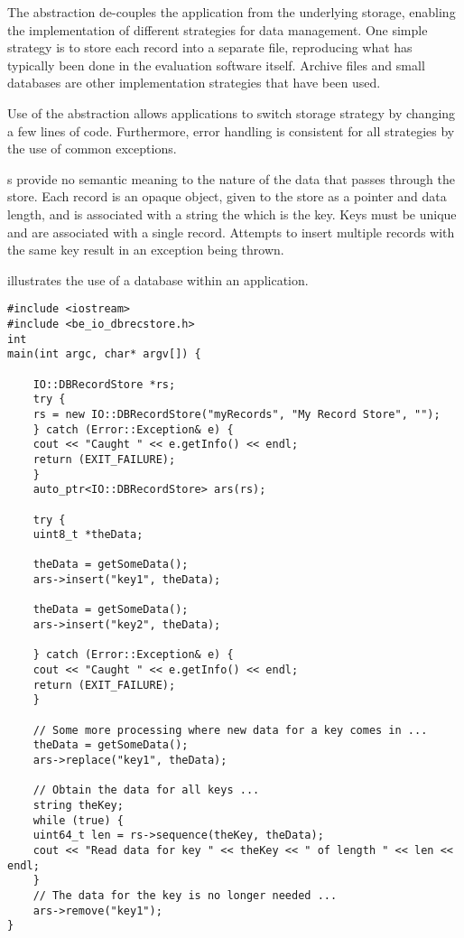 The  abstraction de-couples the application from
the underlying storage, enabling the implementation of different strategies for
data management. One simple strategy is to store each record into a separate
file, reproducing what has typically been done in the evaluation software
itself. Archive files and small databases are other implementation strategies
that have been used.

Use of the  abstraction allows applications to switch
storage strategy by changing a few lines of code. Furthermore, error handling
is consistent for all strategies by the use of common exceptions.

s provide no semantic meaning to the nature of the data that passes
through the store. Each record is an opaque object, given to the store as a
pointer and data length, and is associated with a string the which is the key.
Keys must
be unique and are associated with a single record. Attempts to insert multiple
records with the same key result in an exception being thrown.

 illustrates the use of a database 
within an application.

\begin{lstlisting}[caption={Using a \class{RecordStore}}, label=recordstoreuse]
#include <iostream>
#include <be_io_dbrecstore.h>
int
main(int argc, char* argv[]) {

    IO::DBRecordStore *rs;
    try {
	rs = new IO::DBRecordStore("myRecords", "My Record Store", "");
    } catch (Error::Exception& e) {
	cout << "Caught " << e.getInfo() << endl;
	return (EXIT_FAILURE);
    }
    auto_ptr<IO::DBRecordStore> ars(rs);

    try {
	uint8_t *theData;

	theData = getSomeData();
	ars->insert("key1", theData);

	theData = getSomeData();
	ars->insert("key2", theData);

    } catch (Error::Exception& e) {
	cout << "Caught " << e.getInfo() << endl;
	return (EXIT_FAILURE);
    }

    // Some more processing where new data for a key comes in ...
    theData = getSomeData();
    ars->replace("key1", theData);
  
    // Obtain the data for all keys ...
    string theKey;
    while (true) {
	uint64_t len = rs->sequence(theKey, theData);
	cout << "Read data for key " << theKey << " of length " << len << endl;
    }
    // The data for the key is no longer needed ...
    ars->remove("key1");
}
\end{lstlisting}


